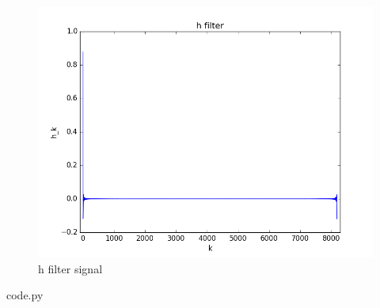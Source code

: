 \begin{figure}[H]
  \includegraphics[width=\textwidth]{1c_signal}
  \caption{h filter signal}
  \label{fig:1c-filter}
\end{figure}


  {code.py}



